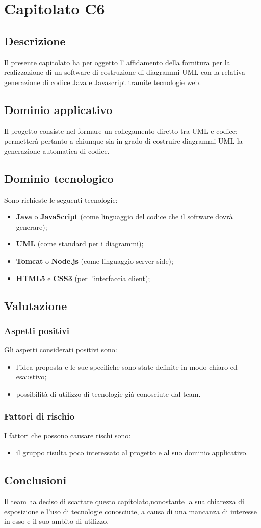 \section {Capitolato C6}
	\subsection {Descrizione}
	Il presente capitolato ha per oggetto l’ affidamento della fornitura per la realizzazione
di un software di costruzione di diagrammi UML con la relativa generazione di codice
Java e Javascript tramite tecnologie web.
	\subsection {Dominio applicativo}
	Il progetto consiste nel formare un collegamento diretto tra UML e codice: permetterà pertanto a chiunque sia in grado di costruire diagrammi UML la generazione automatica di codice.
	\subsection {Dominio tecnologico}
	Sono richieste le seguenti tecnologie:
	\begin {itemize}
	\item \textbf{Java} o \textbf{JavaScript} (come linguaggio del codice che il software dovrà generare);
	\item \textbf{UML} (come standard per i diagrammi);
	\item \textbf{Tomcat} o \textbf{Node.js} (come linguaggio server-side);
	\item \textbf{HTML5} e \textbf{CSS3} (per l'interfaccia client);
	\end {itemize}
	\subsection {Valutazione}
		\subsubsection {Aspetti positivi}
		Gli aspetti considerati positivi sono:
			\begin {itemize}
			 	\item l'idea proposta e le sue specifiche sono state definite in modo chiaro ed esaustivo;
			 	\item possibilità di utilizzo di tecnologie già conosciute dal team.
			\end {itemize}
		\subsubsection {Fattori di rischio}
		I fattori che possono causare rischi sono:
			\begin {itemize}
				\item il gruppo risulta poco interessato al progetto e al suo dominio applicativo.
			\end {itemize}
	\subsection {Conclusioni}
	Il team ha deciso di scartare questo capitolato,nonostante la sua chiarezza di esposizione e l'uso di tecnologie conosciute, a causa di una mancanza di interesse in esso e il suo ambito di utilizzo.